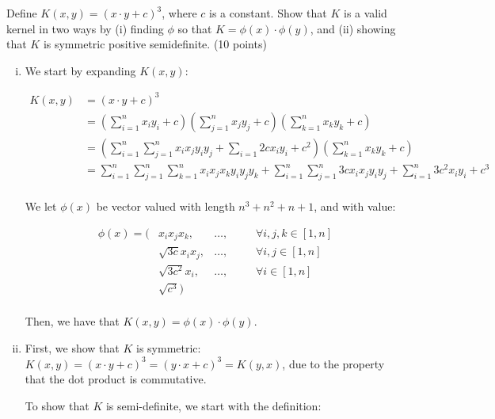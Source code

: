 \documentclass[fleqn]{homework}
\begin{document}
  \begin{problem}{2}
    \begin{question}
      Define $K(x,y)=(x \cdot y+c)^3$, where $c$ is a constant. Show that $K$ is
      a valid kernel in two ways by (i) finding $\phi$ so that
      $K = \phi(x) \cdot \phi(y)$, and (ii) showing that $K$ is symmetric
      positive semidefinite. (10 points)
    \end{question}

    \begin{enumerate}[(i)]
    \item We start by expanding $K(x,y)$:

      \begin{align*}
        K(x,y) &= (x \cdot y + c)^3 \\
               &= \left(\sum_{i=1}^n x_i y_i + c\right)\left(\sum_{j=1}^n x_j y_j + c\right)\left(\sum_{k=1}^n x_k y_k + c\right)\\
               &= \left(\sum_{i=1}^n \sum_{j=1}^n x_ix_jy_iy_j + \sum_{i=1} 2cx_iy_i + c^2\right)\left(\sum_{k=1}^n x_k y_k + c\right)\\
               &= \sum_{i=1}^n \sum_{j=1}^n \sum_{k=1}^n x_ix_jx_k y_iy_jy_k + \sum_{i=1}^n \sum_{j=1}^n 3cx_ix_jy_iy_j + \sum_{i=1}^n 3c^2x_iy_i + c^3 \\
      \end{align*}

      We let $\phi(x)$ be vector valued with length $n^3 + n^2 + n + 1$, and
      with value:

      \begin{align*}
        \phi(x) = (&x_i x_j x_k, &\dots, &&\:\:\:\: \forall i,j,k \in [1,n] \\
        &\sqrt{3c} x_i x_j, &\dots, &&\:\:\:\: \forall i,j \in [1,n] \\
        &\sqrt{3c^2} x_i, &\dots, &&\:\:\:\: \forall i \in [1,n] \\
        & \sqrt{c^3})\\
      \end{align*}

      Then, we have that $K(x,y) = \phi(x) \cdot \phi(y)$.
    \item First, we show that $K$ is symmetric:
      $K(x,y) = (x \cdot y + c)^3 = (y \cdot x + c)^3 = K(y,x)$, due to the
      property that the dot product is commutative.

      To show that $K$ is semi-definite, we start with the definition:


\end{enumerate}
\end{problem}
\end{document}
